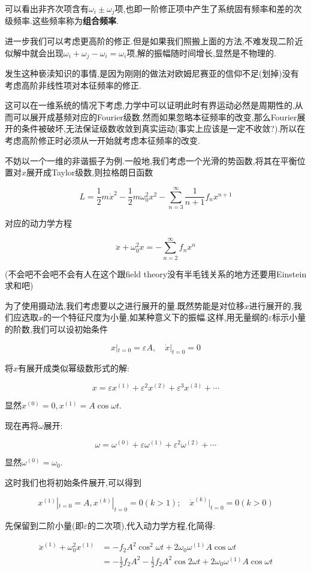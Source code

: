 \documentclass[UTF8]{article}
\begin{document}
	可以看出非齐次项含有$\omega_i\pm\omega_j$项,也即一阶修正项中产生了系统固有频率和差的次级频率.这些频率称为\textbf{组合频率}.
	
	进一步我们可以考虑更高阶的修正.但是如果我们照搬上面的方法,不难发现二阶近似解中就会出现$\omega_i+\omega_j-\omega_i=\omega_i$项,解的振幅随时间增长,显然是不物理的.
	
	发生这种亵渎知识的事情,是因为刚刚的做法对欧姆尼赛亚的信仰不足(划掉)没有考虑高阶非线性项对本征频率的修正.
	
	这可以在一维系统的情况下考虑,力学中可以证明此时有界运动必然是周期性的,从而可以展开成基频对应的Fourier级数.然而如果忽略本征频率的改变,那么Fourier展开的条件被破坏,无法保证级数收敛到真实运动(事实上应该是一定不收敛?).所以在考虑高阶修正时必须从一开始就考虑本征频率的改变.
	
	不妨以一个一维的非谐振子为例.一般地,我们考虑一个光滑的势函数,将其在平衡位置对$x$展开成Taylor级数,则拉格朗日函数
	
	\[L=\frac{1}{2}m\dot{x}^2-\frac{1}{2}m\omega_0^2x^2-\sum_{n=3}^{\infty}\frac{1}{n+1}f_nx^{n+1}\]
	
	对应的动力学方程
	
	\[\ddot{x}+\omega_0^2x=-\sum_{n=2}^{\infty}f_nx^n\]
	
	(不会吧不会吧不会有人在这个跟field theory没有半毛钱关系的地方还要用Einstein求和吧)
	
	为了使用摄动法,我们考虑要以之进行展开的量.既然势能是对位移$x$进行展开的,我们应选取$x$的一个特征尺度为小量,如某种意义下的振幅.这样,用无量纲的$\varepsilon$标示小量的阶数,我们可以设初始条件
	
	\[x|_{t=0}=\varepsilon A,\quad\dot{x}|_{t=0}=0\]
	
	将$x$有展开成类似幂级数形式的解:
	
	\[x=\varepsilon x^{(1)}+\varepsilon^2 x^{(2)}+\varepsilon^3 x^{(3)}+\cdots\]
	
	显然$x^{(0)}=0,x^{(1)}=A\cos \omega t$.
	
	现在再将$\omega$展开:
	
	\[\omega=\omega^{(0)}+\varepsilon\omega^{(1)}+\varepsilon^2\omega^{(2)}+\cdots\]
	
	显然$\omega^{(0)}=\omega_0$.
	
	这时我们也将初始条件展开,可以得到
	
	\[x^{(1)}|_{t=0}=A,x^{(k)}|_{t=0}=0(k>1);\quad \dot{x}^{(k)}|_{t=0}=0(k>0)\]
	
	先保留到二阶小量(即$\varepsilon$的二次项),代入动力学方程,化简得:
	
	\[
		\begin{aligned}
			\ddot{x}^{(1)}+\omega_0^2 x^{(1)}
			&=-f_2A^2\cos^2\omega t+2\omega_0\omega^{(1)}A\cos\omega t\\
			&=-\frac{1}{2}f_2A^2-\frac{1}{2}f_2A^2\cos2\omega t+2\omega_0\omega^{(1)}A\cos\omega t
		\end{aligned}
	\]
	
\end{document}
